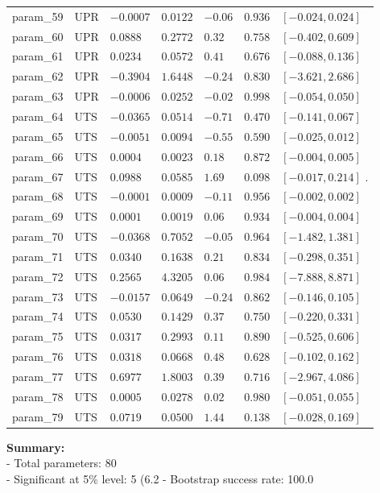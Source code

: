 \documentclass{article}
\begin{document}
\begin{longtable}{lllllll}
param\_59 & UPR & $-0.0007$ & $0.0122$ & $-0.06$ & $0.936$ & $[-0.024, 0.024]$  \\
param\_60 & UPR & $0.0888$ & $0.2772$ & $0.32$ & $0.758$ & $[-0.402, 0.609]$  \\
param\_61 & UPR & $0.0234$ & $0.0572$ & $0.41$ & $0.676$ & $[-0.088, 0.136]$  \\
param\_62 & UPR & $-0.3904$ & $1.6448$ & $-0.24$ & $0.830$ & $[-3.621, 2.686]$  \\
param\_63 & UPR & $-0.0006$ & $0.0252$ & $-0.02$ & $0.998$ & $[-0.054, 0.050]$  \\
param\_64 & UTS & $-0.0365$ & $0.0514$ & $-0.71$ & $0.470$ & $[-0.141, 0.067]$  \\
param\_65 & UTS & $-0.0051$ & $0.0094$ & $-0.55$ & $0.590$ & $[-0.025, 0.012]$  \\
param\_66 & UTS & $0.0004$ & $0.0023$ & $0.18$ & $0.872$ & $[-0.004, 0.005]$  \\
param\_67 & UTS & $0.0988$ & $0.0585$ & $1.69$ & $0.098$ & $[-0.017, 0.214]$ . \\
param\_68 & UTS & $-0.0001$ & $0.0009$ & $-0.11$ & $0.956$ & $[-0.002, 0.002]$  \\
param\_69 & UTS & $0.0001$ & $0.0019$ & $0.06$ & $0.934$ & $[-0.004, 0.004]$  \\
param\_70 & UTS & $-0.0368$ & $0.7052$ & $-0.05$ & $0.964$ & $[-1.482, 1.381]$  \\
param\_71 & UTS & $0.0340$ & $0.1638$ & $0.21$ & $0.834$ & $[-0.298, 0.351]$  \\
param\_72 & UTS & $0.2565$ & $4.3205$ & $0.06$ & $0.984$ & $[-7.888, 8.871]$  \\
param\_73 & UTS & $-0.0157$ & $0.0649$ & $-0.24$ & $0.862$ & $[-0.146, 0.105]$  \\
param\_74 & UTS & $0.0530$ & $0.1429$ & $0.37$ & $0.750$ & $[-0.220, 0.331]$  \\
param\_75 & UTS & $0.0317$ & $0.2993$ & $0.11$ & $0.890$ & $[-0.525, 0.606]$  \\
param\_76 & UTS & $0.0318$ & $0.0668$ & $0.48$ & $0.628$ & $[-0.102, 0.162]$  \\
param\_77 & UTS & $0.6977$ & $1.8003$ & $0.39$ & $0.716$ & $[-2.967, 4.086]$  \\
param\_78 & UTS & $0.0005$ & $0.0278$ & $0.02$ & $0.980$ & $[-0.051, 0.055]$  \\
param\_79 & UTS & $0.0719$ & $0.0500$ & $1.44$ & $0.138$ & $[-0.028, 0.169]$  \\
\bottomrule
\end{longtable}
\bigskip
\textbf{Summary:}\\
- Total parameters: 80\\
- Significant at 5\% level: 5 (6.2%
- Bootstrap success rate: 100.0%
\end{document}
